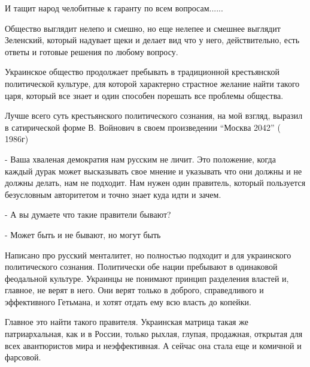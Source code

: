 И  тащит народ челобитные к гаранту по всем вопросам......

Общество выглядит нелепо и  смешно, но еще  нелепее и смешнее выглядит
Зеленский, который надувает щеки и делает вид что у него, действительно, есть
ответы и готовые решения по любому вопросу.   

Украинское общество продолжает пребывать  в  традиционной  крестьянской
политической  культуре, для  которой характерно страстное  желание найти такого
царя, который все знает и один способен порешать все проблемы общества.  

Лучше всего  суть крестьянского политического сознания, на мой взгляд, выразил
в сатирической форме В. Войнович в своем произведении  \enquote{Москва 2042} (
1986г)

- Ваша хваленая демократия  нам русским не личит.  Это положение, когда каждый
дурак может высказывать  свое мнение и указывать  что они должны и не должны
делать, нам не подходит.  Нам нужен один правитель, который пользуется
безусловным   авторитетом  и точно знает куда идти  и зачем.

- А вы думаете что такие правители бывают? 

- Может быть и не бывают, но могут быть

Написано про русский менталитет, но полностью подходит и для украинского
политического сознания.  Политически обе нации пребывают в одинаковой
феодальной культуре.   Украинцы не понимают принцип разделения властей и,
главное, не верят в него.  Они верят только в  доброго, справедливого и
эффективного Гетьмана, и хотят отдать ему всю власть до копейки.   

Главное  это  найти такого правителя.  Украинская матрица такая же
патриархальная, как и в  России, только  рыхлая, глупая, продажная, открытая
для всех авантюристов мира и неэффективная.   А сейчас она стала еще и комичной
и фарсовой.
